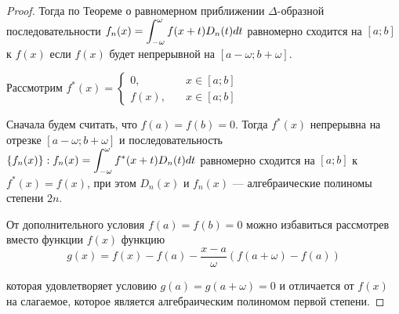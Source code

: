 \begin{proof}
    Тогда по Теореме о равномерном приближении $\Delta$-образной последовательности
    $f_n(x) = \displaystyle\int_{-\omega}^\omega f(x + t) D_n(t) dt$ равномерно сходится
    на $[a; b]$ к $f(x)$ если $f(x)$ будет непрерывной на $[a - \omega; b + \omega]$.

    Рассмотрим $f^*(x) = \begin{cases}
        0, \quad &x \in [a; b] \\
        f(x), \quad &x \in [a; b]
    \end{cases}$

    Сначала будем считать, что $f(a) = f(b) = 0$. Тогда $f^*(x)$ непрерывна на
    отрезке $[a - \omega; b + \omega]$ и последовательность $\{ f_n(x) \} : 
    f_n(x) = \displaystyle\int_{-\omega}^\omega f^*(x + t) D_n(t) dt$ равномерно сходится
    на $[a; b]$ к $f^*(x) = f(x)$, при этом $D_n(x)$ и $f_n(x)$ --- 
    алгебраические полиномы степени $2n$.

    От дополнительного условия $f(a) = f(b) = 0$ можно избавиться рассмотрев
    вместо функции $f(x)$ функцию 
    \[ g(x) = f(x) - f(a) - \frac{x - a}{\omega} (f(a + \omega) - f(a)) \]

    которая удовлетворяет условию $g(a) = g(a + \omega) = 0$ и отличается от
    $f(x)$ на слагаемое, которое является алгебраическим полиномом 
    первой степени.
\end{proof}


